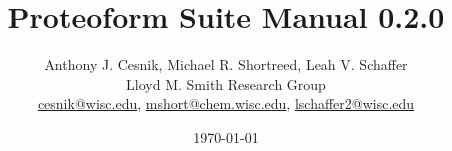 

\title{Proteoform Suite Manual 0.2.0}
\author{Anthony J. Cesnik, Michael R. Shortreed, Leah V. Schaffer \\[2ex]
	Lloyd M. Smith Research Group \\[2ex]
	\href{mailto:cesnik@wisc.edu}{cesnik@wisc.edu}, \href{mailto:mshort@chem.wisc.edu}{mshort@chem.wisc.edu}, \href{mailto:lschaffer2@wisc.edu}{lschaffer2@wisc.edu}}
\date{\today}



\maketitle


{}
\tableofcontents
\pagebreak


\pagebreak

\pagebreak

\pagebreak

\pagebreak

\pagebreak

\pagebreak

\pagebreak

\pagebreak

\pagebreak

\pagebreak

\pagebreak



\pagebreak
{}
\printbibliography


